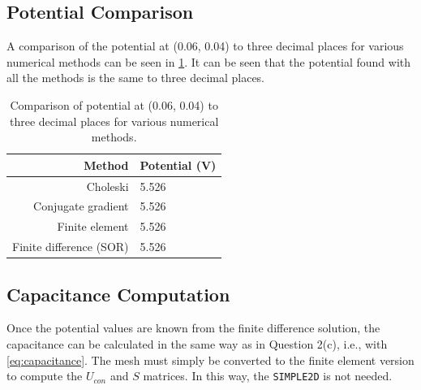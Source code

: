 \documentclass[a4paper,titlepage]{article}
\newcommand{\code}[1]{\texttt{#1}}
\begin{document}
	\subsection{Potential Comparison}
	
	A comparison of the potential at (0.06, 0.04) to three decimal places for various numerical methods can be seen in \cref{table:potential_comparison}. It can be seen that the potential found with all the methods is the same to three decimal places.
	
	\begin{table}[!htb]
		\centering
		\caption{Comparison of potential at (0.06, 0.04) to three decimal places for various numerical methods.}
		\begin{tabular}{r | l}
			\textbf{Method} & \textbf{Potential (V)} \\ \hline
			Choleski & 5.526 \\
			Conjugate gradient & 5.526 \\
			Finite element & 5.526 \\
			Finite difference (SOR) & 5.526
		\end{tabular}
		\label{table:potential_comparison}
	\end{table}
	
	\subsection{Capacitance Computation}
	
	Once the potential values are known from the finite difference solution, the capacitance can be calculated in the same way as in Question 2(c), i.e., with \cref{eq:capacitance}. The mesh must simply be converted to the finite element version to compute the $U_{con}$ and $S$ matrices. In this way, the \code{SIMPLE2D} is not needed.
	
%
	
	\onecolumn
	
\end{document}
